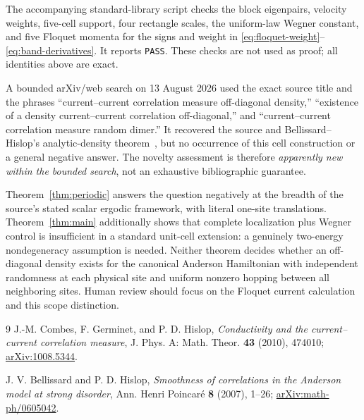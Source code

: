 \documentclass[10pt]{article}
\begin{document}
The accompanying standard-library script checks the block eigenpairs,
velocity weights, five-cell support, four rectangle scales, the uniform-law
Wegner constant, and five Floquet momenta for the signs and weight in
\eqref{eq:floquet-weight}--\eqref{eq:band-derivatives}. It reports
\texttt{PASS}. These checks are not used as proof; all identities above are
exact.

A bounded arXiv/web search on 13 August 2026 used the exact source title and
the phrases ``current--current correlation measure off-diagonal density,''
``existence of a density current--current correlation off-diagonal,'' and
``current--current correlation measure random dimer.'' It recovered the source
and Bellissard--Hislop's analytic-density theorem~\cite{bh}, but no occurrence
of this cell construction or a general negative answer. The novelty assessment
is therefore \emph{apparently new within the bounded search}, not an exhaustive
bibliographic guarantee.

Theorem~\ref{thm:periodic} answers the question negatively at the breadth of
the source's stated scalar ergodic framework, with literal one-site
translations. Theorem~\ref{thm:main} additionally shows that complete
localization plus Wegner control is insufficient in a standard unit-cell
extension: a genuinely two-energy nondegeneracy assumption is needed. Neither
theorem decides whether an off-diagonal density exists for the canonical
Anderson Hamiltonian with independent randomness at each physical site and
uniform nonzero hopping between all neighboring sites. Human review should
focus on the Floquet current calculation and this scope distinction.

\begin{thebibliography}{9}
J.-M. Combes, F. Germinet, and P. D. Hislop,
\emph{Conductivity and the current--current correlation measure},
J. Phys. A: Math. Theor. \textbf{43} (2010), 474010;
\href{https://arxiv.org/abs/1008.5344}{arXiv:1008.5344}.

J. V. Bellissard and P. D. Hislop,
\emph{Smoothness of correlations in the Anderson model at strong disorder},
Ann. Henri Poincar\'e \textbf{8} (2007), 1--26;
\href{https://arxiv.org/abs/math-ph/0605042}{arXiv:math-ph/0605042}.
\end{thebibliography}
\end{document}

